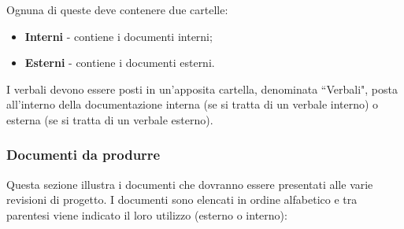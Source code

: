 			Ognuna di queste deve contenere due cartelle:

			\begin{itemize}
			    \item \textbf{Interni} - contiene i documenti interni;
			    \item \textbf{Esterni} - contiene i documenti esterni.
			\end{itemize}

			I verbali devono essere posti in un'apposita cartella, denominata ``Verbali", posta all'interno della
			documentazione interna (se si tratta di un verbale interno) o esterna (se si tratta di un verbale esterno).

		\subsubsection{Documenti da produrre} \label{documenti_prodotti}

			Questa sezione illustra i documenti che dovranno essere presentati alle varie revisioni
			di progetto. I documenti sono elencati in ordine alfabetico e tra parentesi viene 
			indicato il loro utilizzo (esterno o interno):


